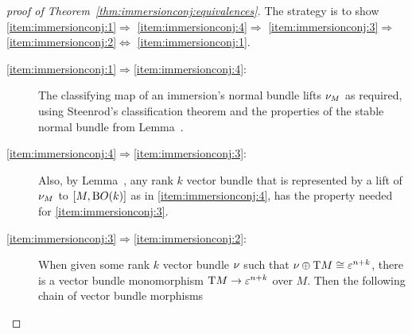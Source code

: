 \begin{proof}[proof of Theorem~\ref{thm:immersionconj:equivalences}]
  The strategy is to show
  \ref{item:immersionconj:1}$\Rightarrow$%
  \ref{item:immersionconj:4}$\Rightarrow$%
  \ref{item:immersionconj:3}$\Rightarrow$%
  \ref{item:immersionconj:2}$\Leftrightarrow$%
  \ref{item:immersionconj:1}.
  \begin{description}
  \item[\ref{item:immersionconj:1}$\Rightarrow$\ref{item:immersionconj:4}:]
    The classifying map of an immersion's normal bundle
    lifts $\nu_{M}$ as required,
    using Steenrod's classification theorem
     and the properties
    of the stable normal bundle from
    Lemma~.
  \item[\ref{item:immersionconj:4}$\Rightarrow$\ref{item:immersionconj:3}:]
    Also, by
    Lemma~,
    any rank $k$ vector bundle that is represented by a lift of
    $\nu_{M}$ to $[M,\mathrm{B}O(k)]$ as in \ref{item:immersionconj:4},
    has the property needed for \ref{item:immersionconj:3}.
  \item[\ref{item:immersionconj:3}$\Rightarrow$\ref{item:immersionconj:2}:]
    When given some rank $k$ vector bundle $\nu_{}$
    such that $\nu_{}\oplus\mathrm{T}M\cong\varepsilon^{n+k}$, there is a vector
    bundle monomorphism $\mathrm{T}M\to\varepsilon^{n+k}$ over $M$. Then the
    following chain of vector bundle morphisms
    \begin{center}
\end{center}
\end{description}
\end{proof}
